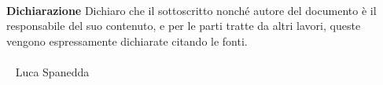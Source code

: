 \documentclass[12pt]{article}
\begin{document}


\newpage
\
\newpage

\vfill
\LARGE \textbf{Dichiarazione} \normalsize \newline \newline
Dichiaro che il sottoscritto nonché autore del
documento è il responsabile del suo contenuto,
e per le parti tratte da altri lavori,
queste vengono espressamente dichiarate
citando le fonti. \\  \\
\
\hspace*{\fill} \large Luca Spanedda \normalsize
\
\newpage


\newpage
\
\newpage


\newpage
\
\newpage


\tableofcontents
\listoftables
\listoffigures
\newpage

\pagestyle{fancy}


\clearpage

\clearpage

\clearpage

\clearpage
\appendix

\clearpage
\printbibliography
\end{document}
